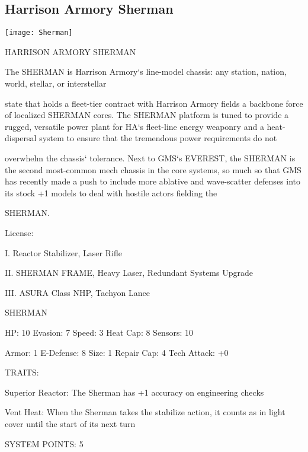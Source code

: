 \subsection{Harrison Armory Sherman}

\begin{center}
    \texttt{[image: Sherman]}
\end{center}

                              HARRISON ARMORY SHERMAN

The SHERMAN is Harrison Armory‘s line-model chassis: any station, nation, world, stellar, or interstellar

state that holds a fleet-tier contract with Harrison Armory fields a backbone force of localized SHERMAN
cores. The SHERMAN platform is tuned to provide a rugged, versatile power plant for HA‘s fleet-line
energy weaponry and a heat-dispersal system to ensure that the tremendous power requirements do not

overwhelm the chassis‘ tolerance. Next to GMS‘s EVEREST, the SHERMAN is the second most-common
mech chassis in the core systems, so much so that GMS has recently made a push to include more
ablative and wave-scatter defenses into its stock +1 models to deal with hostile actors fielding the

SHERMAN.

                                                  License:

I. Reactor Stabilizer, Laser Rifle

II. SHERMAN FRAME, Heavy Laser, Redundant Systems Upgrade

III. ASURA Class NHP, Tachyon Lance


                                                SHERMAN

 HP: 10         Evasion: 7                            Speed: 3           Heat Cap: 8       Sensors: 10

 Armor: 1       E-Defense: 8                          Size: 1            Repair Cap: 4     Tech Attack:
                                                                                           +0

                                                  TRAITS:

 Superior Reactor: The Sherman has +1 accuracy on engineering checks

 Vent Heat: When the Sherman takes the stabilize action, it counts as in light cover until the start of its
 next turn

                                            SYSTEM POINTS: 5

